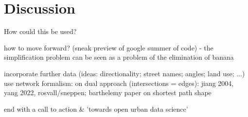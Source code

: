 \section{Discussion}
\label{sec:discussion}

How could this be used?

how to move forward? (sneak preview of google summer of code) - the simplification problem can be seen as a problem of the elimination of banana

incorporate further data (ideas: directionality; street names; angles; land use; ...)
use network formalism: on dual approach (intersections = edges): jiang 2004, yang 2022,
rosvall/sneppen; barthelemy paper on shortest path shape

end with a call to action \& 'towards open urban data science'